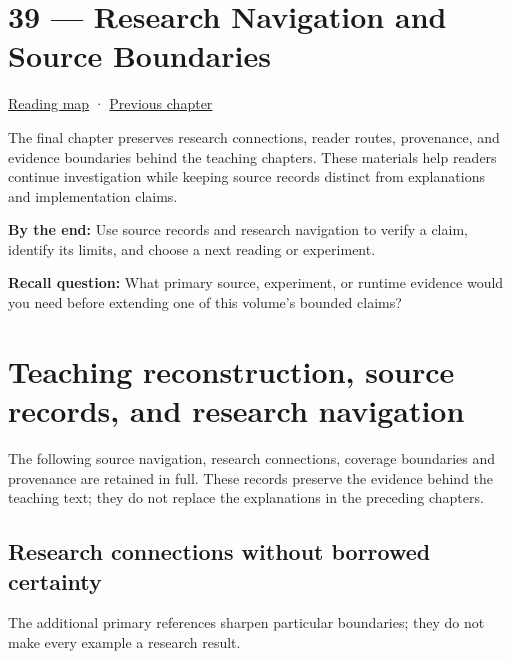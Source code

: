 \hypertarget{02-foundations-ii-ch039}{}
\chapter{39 --- Research Navigation and Source Boundaries}\label{02-foundations-ii-ch039-research-navigation-and-source-boundaries}

\hyperref[volume-reading-map]{Reading map} · \hyperref[02-foundations-ii-ch038]{Previous chapter}

The final chapter preserves research connections, reader routes, provenance, and evidence boundaries behind the teaching chapters. These materials help readers continue investigation while keeping source records distinct from explanations and implementation claims.

\textbf{By the end:} Use source records and research navigation to verify a claim, identify its limits, and choose a next reading or experiment.

\textbf{Recall question:} What primary source, experiment, or runtime evidence would you need before extending one of this volume's bounded claims?

\chapter{Teaching reconstruction, source records, and research navigation}\label{02-foundations-ii-ch039-teaching-reconstruction-source-records-and-research-navigation}

The following source navigation, research connections, coverage boundaries and provenance are retained in full. These records preserve the evidence behind the teaching text; they do not replace the explanations in the preceding chapters.

\section{Research connections without borrowed certainty}\label{02-foundations-ii-ch039-research-connections-without-borrowed-certainty}

The additional primary references sharpen particular boundaries; they do not make every example a research result.

